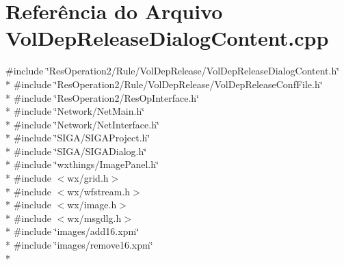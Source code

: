\section{Referência do Arquivo Vol\+Dep\+Release\+Dialog\+Content.\+cpp}
\label{_2_rule_2_vol_dep_release_2_vol_dep_release_dialog_content_8cpp}
{\ttfamily \#include \char`\"{}Res\+Operation2/\+Rule/\+Vol\+Dep\+Release/\+Vol\+Dep\+Release\+Dialog\+Content.\+h\char`\"{}}\\*
{\ttfamily \#include \char`\"{}Res\+Operation2/\+Rule/\+Vol\+Dep\+Release/\+Vol\+Dep\+Release\+Conf\+File.\+h\char`\"{}}\\*
{\ttfamily \#include \char`\"{}Res\+Operation2/\+Res\+Op\+Interface.\+h\char`\"{}}\\*
{\ttfamily \#include \char`\"{}Network/\+Net\+Main.\+h\char`\"{}}\\*
{\ttfamily \#include \char`\"{}Network/\+Net\+Interface.\+h\char`\"{}}\\*
{\ttfamily \#include \char`\"{}S\+I\+G\+A/\+S\+I\+G\+A\+Project.\+h\char`\"{}}\\*
{\ttfamily \#include \char`\"{}S\+I\+G\+A/\+S\+I\+G\+A\+Dialog.\+h\char`\"{}}\\*
{\ttfamily \#include \char`\"{}wxthings/\+Image\+Panel.\+h\char`\"{}}\\*
{\ttfamily \#include $<$wx/grid.\+h$>$}\\*
{\ttfamily \#include $<$wx/wfstream.\+h$>$}\\*
{\ttfamily \#include $<$wx/image.\+h$>$}\\*
{\ttfamily \#include $<$wx/msgdlg.\+h$>$}\\*
{\ttfamily \#include \char`\"{}images/add16.\+xpm\char`\"{}}\\*
{\ttfamily \#include \char`\"{}images/remove16.\+xpm\char`\"{}}\\*
